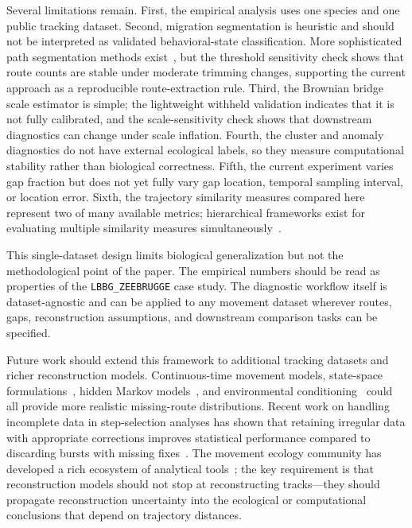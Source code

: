 \documentclass[pdflatex,sn-vancouver-num]{sn-jnl}
\begin{document}
Several limitations remain. First, the empirical analysis uses one species and one public tracking dataset. Second, migration segmentation is heuristic and should not be interpreted as validated behavioral-state classification. More sophisticated path segmentation methods exist~\cite{edelhoff2020,gurarie2017}, but the threshold sensitivity check shows that route counts are stable under moderate trimming changes, supporting the current approach as a reproducible route-extraction rule. Third, the Brownian bridge scale estimator is simple; the lightweight withheld validation indicates that it is not fully calibrated, and the scale-sensitivity check shows that downstream diagnostics can change under scale inflation. Fourth, the cluster and anomaly diagnostics do not have external ecological labels, so they measure computational stability rather than biological correctness. Fifth, the current experiment varies gap fraction but does not yet fully vary gap location, temporal sampling interval, or location error. Sixth, the trajectory similarity measures compared here represent two of many available metrics; hierarchical frameworks exist for evaluating multiple similarity measures simultaneously~\cite{wan2023}.

This single-dataset design limits biological generalization but not the methodological point of the paper. The empirical numbers should be read as properties of the \texttt{LBBG\_ZEEBRUGGE} case study. The diagnostic workflow itself is dataset-agnostic and can be applied to any movement dataset wherever routes, gaps, reconstruction assumptions, and downstream comparison tasks can be specified.

Future work should extend this framework to additional tracking datasets and richer reconstruction models. Continuous-time movement models, state-space formulations~\cite{patterson2008,pozdnyakov2014}, hidden Markov models~\cite{michelot2016}, and environmental conditioning~\cite{dodge2013} could all provide more realistic missing-route distributions. Recent work on handling incomplete data in step-selection analyses has shown that retaining irregular data with appropriate corrections improves statistical performance compared to discarding bursts with missing fixes~\cite{hofmann2024}. The movement ecology community has developed a rich ecosystem of analytical tools~\cite{joo2020}; the key requirement is that reconstruction models should not stop at reconstructing tracks---they should propagate reconstruction uncertainty into the ecological or computational conclusions that depend on trajectory distances.
\end{document}

